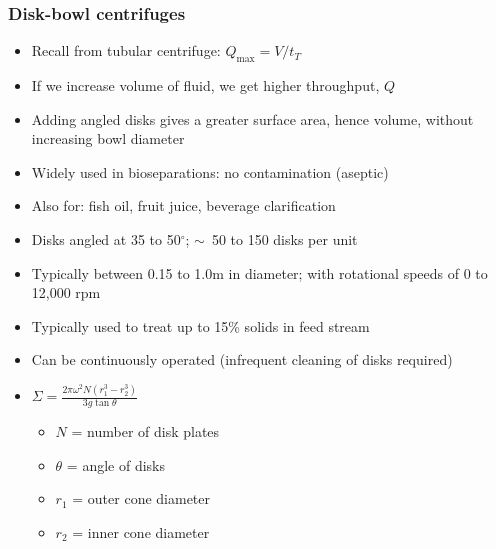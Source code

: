 \begin{frame}\frametitle{Disk-bowl centrifuges}
	\begin{itemize}		
		\item	Recall from tubular centrifuge: $Q_\text{max} = V / t_T$
		\item	If we increase volume of fluid, we get higher throughput, $Q$
		\item	Adding angled disks gives a greater surface area, hence volume, without increasing bowl diameter
		\item	Widely used in bioseparations: no contamination (aseptic) 
		\item	Also for: fish oil, fruit juice, beverage clarification
		\item	Disks angled at 35 to 50$^\circ$; $\sim$~50 to 150 disks per unit
		\item	Typically between 0.15 to 1.0m in diameter; with rotational speeds of 0 to 12,000 rpm
		\item	Typically used to treat up to 15\% solids in feed stream
		\item	Can be continuously operated (infrequent cleaning of disks required)
		\item	$\Sigma = \displaystyle \frac{2\pi\omega^2 N(r_1^3 - r_2^3)}{3g \tan \theta}$
			\begin{itemize}
				\item	$N$ = number of disk plates
				\item	$\theta$ = angle of disks
				\item	$r_1$ = outer cone diameter
				\item	$r_2$ = inner cone diameter
			\end{itemize}
	\end{itemize}
\end{frame}

